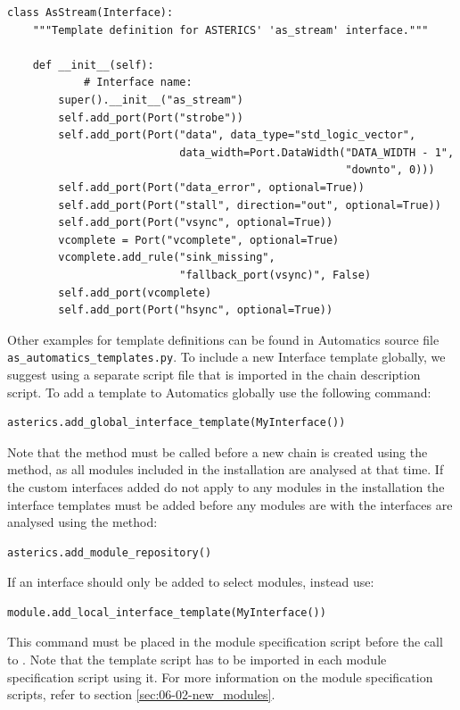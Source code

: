 \begin{lstlisting}[style=AutomaticsPython, label=Code:06-02-define_as_stream, caption=Definition of the \texttt{as\_stream} Interface template]
class AsStream(Interface):
    """Template definition for ASTERICS' 'as_stream' interface."""

    def __init__(self):
    		# Interface name:
        super().__init__("as_stream")
        self.add_port(Port("strobe"))
        self.add_port(Port("data", data_type="std_logic_vector",
                           data_width=Port.DataWidth("DATA_WIDTH - 1",
                                                     "downto", 0)))
        self.add_port(Port("data_error", optional=True))
        self.add_port(Port("stall", direction="out", optional=True))
        self.add_port(Port("vsync", optional=True))
        vcomplete = Port("vcomplete", optional=True)
        vcomplete.add_rule("sink_missing", 
                           "fallback_port(vsync)", False)
        self.add_port(vcomplete)
        self.add_port(Port("hsync", optional=True))

\end{lstlisting}

Other examples for template definitions can be found in Automatics source file \texttt{as\_automatics\_templates.py}.
To include a new Interface template globally, we suggest using a separate script file that is imported in the chain description script.
To add a template to Automatics globally use the following command:
\begin{lstlisting}[style=AutomaticsPython]
asterics.add_global_interface_template(MyInterface())
\end{lstlisting}
Note that the method must be called before a new chain is created using the  method, as all modules included in the \asterics installation are analysed at that time.
If the custom interfaces added do not apply to any modules in the \asterics installation the interface templates must be added before any modules are with the interfaces are analysed using the method:
\begin{lstlisting}[style=AutomaticsPython]
asterics.add_module_repository()
\end{lstlisting} 
If an interface should only be added to select modules, instead use:
\begin{lstlisting}[style=AutomaticsPython]
module.add_local_interface_template(MyInterface())
\end{lstlisting}
This command must be placed in the module specification script before the call to .
Note that the template script has to be imported in each module specification script using it.
For more information on the module specification scripts, refer to section \ref{sec:06-02-new_modules}.

